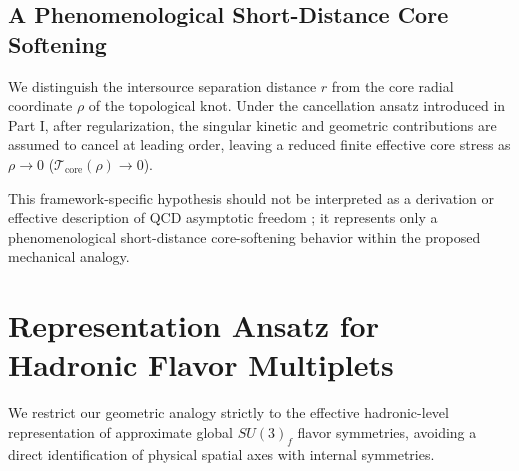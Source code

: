\documentclass[reprint,amsmath,amssymb,aps,prd]{revtex4-2}
\begin{document}
\subsection{A Phenomenological Short-Distance Core Softening}
We distinguish the intersource separation distance $r$ from the core radial coordinate $\rho$ of the topological knot. Under the cancellation ansatz introduced in Part I, after regularization, the singular kinetic and geometric contributions are assumed to cancel at leading order, leaving a reduced finite effective core stress as $\rho \to 0$ ($\mathcal{T}_{\mathrm{core}}(\rho) \to 0$).

This framework-specific hypothesis should not be interpreted as a derivation or effective description of QCD asymptotic freedom \cite{Gross1973}; it represents only a phenomenological short-distance core-softening behavior within the proposed mechanical analogy.

\section{Representation Ansatz for Hadronic Flavor Multiplets}

We restrict our geometric analogy strictly to the effective hadronic-level representation of approximate global $SU(3)_f$ flavor symmetries, avoiding a direct identification of physical spatial axes with internal symmetries.
\end{document}
